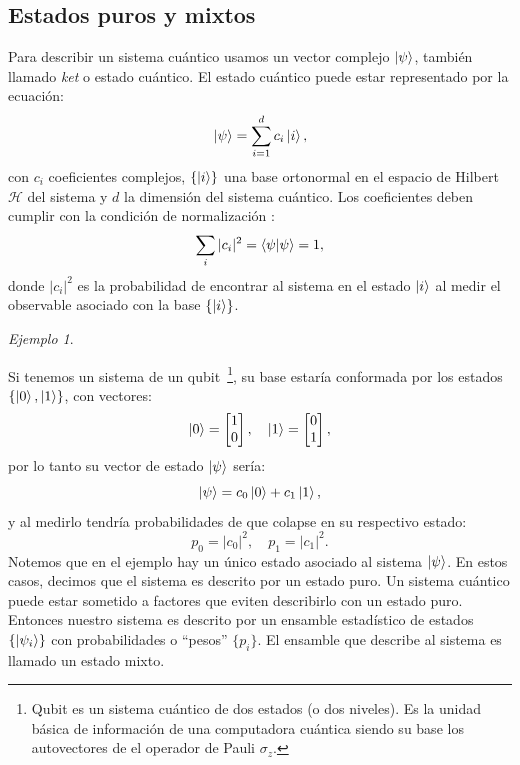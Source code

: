 \documentclass[letterpaper,12pt]{thesisECFM}
\theoremstyle{plain}
\theoremstyle{definition}
\theoremstyle{definition}
\theoremstyle{remark}
\newcommand{\1}{\mathbb{1}}
\newtheorem{ex}{Ejemplo}[section]
\begin{document}
\subsection{Estados puros y mixtos} %
Para describir un sistema cuántico usamos un vector complejo $\ket{\psi}$,
también llamado \textit{ket} o estado cuántico. El
estado cuántico puede estar representado por la ecuación: 
\begin{equation}
     \label{eq:1.1}
         \ket{\psi} = \sum_{i=1}^{d} c_i \ket{i},
\end{equation}
con $c_i$ coeficientes complejos,
$\{\ket{i}\}$ una base ortonormal en el espacio de Hilbert $\mathcal{H}$ del
sistema  y $d$ la dimensión del
sistema cuántico.  Los coeficientes deben cumplir con la condición de
normalización \cite{nielsen_chuang_2011}:
    \begin{equation}
    \label{ec::1.2}
           \sum_i |c_i|^2=\braket{\psi}{\psi}=1, 
    \end{equation} 
donde $|c_i|^2$ es la probabilidad de encontrar al sistema en el estado
$\ket{i}$ al medir el observable asociado con la base $\{\ket{i} \}$.

\begin{ex} \label{ex: dens1}\end{ex} Si tenemos un sistema de un
qubit~\footnote{Qubit es un sistema cuántico de dos estados (o dos niveles). Es
la
unidad básica de información de una computadora cuántica siendo su base los
autovectores de el operador de Pauli 
$\sigma_z$.}, su base estaría conformada
por los estados $\{{\ket{0},\ket{1}}\}$, con vectores:
\begin{equation}
\ket{0} = \begin{bmatrix} 
    1 \\
    0 \\
    \end{bmatrix}, \quad \ket{1}=\begin{bmatrix} 
    0 \\
    1 \\
    \end{bmatrix},     
\end{equation} 
    por lo tanto su vector de estado $\ket{\psi}$ sería:
    \begin{equation}
      \ket{\psi} = c_0 \ket{0} + c_1 \ket{1},   
    \end{equation}
    y al medirlo tendría probabilidades de que colapse en su respectivo estado:
    \begin{equation}
     p_0=|c_0|^2, \quad p_1=|c_1|^2.
    \end{equation}
Notemos que en el ejemplo hay un único estado asociado al sistema $\ket{\psi}$.
En estos casos, decimos que el sistema es descrito por un estado puro.
Un sistema cuántico puede estar sometido a factores que eviten describirlo con
un estado puro.  Entonces nuestro sistema es descrito por un ensamble
estadístico de estados $\{\ket{\psi_i} \}$  con probabilidades o ``pesos''
$\{p_i\}$. El ensamble que describe al sistema  es llamado un estado mixto.
\end{document}
